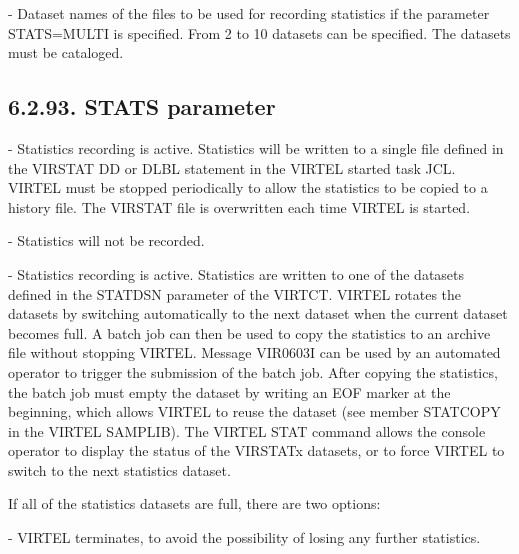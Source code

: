 \documentclass[letterpaper,10pt,english]{sphinxmanual}
\begin{document}
 - Dataset names of the files to be used for recording statistics if the parameter STATS=MULTI is specified. From 2 to 10 datasets can be specified. The datasets must be cataloged.


\subsection{6.2.93. STATS parameter}
\label{\detokenize{Installation_Guide:stats-parameter}}
\begin{sphinxVerbatim}[commandchars=\\\{\}]
     
\end{sphinxVerbatim}

 - Statistics recording is active. Statistics will be written to a single file defined in the VIRSTAT DD or DLBL statement in the VIRTEL started task JCL. VIRTEL must be stopped periodically to allow the statistics to be copied to a history file. The VIRSTAT file is overwritten each time VIRTEL is started.

 - Statistics will not be recorded.

 - Statistics recording is active. Statistics are written to one of the datasets defined in the STATDSN parameter of the VIRTCT. VIRTEL rotates the datasets by switching automatically to the next dataset when the current dataset becomes full. A batch job can then be used to copy the statistics to an archive file without stopping VIRTEL. Message VIR0603I can be used by an automated operator to trigger the submission of the batch job. After copying the statistics, the batch job must empty the dataset by writing an EOF marker at the beginning, which allows VIRTEL to reuse the dataset (see member STATCOPY in the VIRTEL SAMPLIB).
The VIRTEL STAT command allows the console operator to display the status of the VIRSTATx datasets, or to force VIRTEL to switch to the next statistics dataset.

If all of the statistics datasets are full, there are two options:

 - VIRTEL terminates, to avoid the possibility of losing any further statistics.
\end{document}
